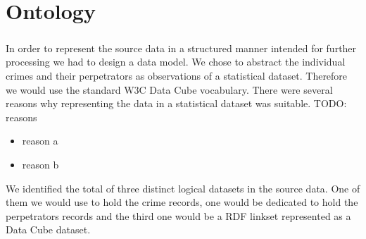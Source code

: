 \chapter{Ontology}

\paragraph{}
In order to represent the source data in a structured manner intended for further processing we had to design a data model.
We chose to abstract the individual crimes and their perpetrators as observations of a statistical dataset. Therefore we would use
the standard W3C Data Cube vocabulary.
There were several reasons why representing the data in a statistical dataset was suitable.
TODO: reasons
\begin{itemize}
	\item reason a
	\item reason b
\end{itemize}

We identified the total of three distinct logical datasets in the source data.
One of them we would use to hold the crime records, one would be dedicated to hold the
perpetrators records and the third one would be a RDF linkset represented as a Data Cube dataset.